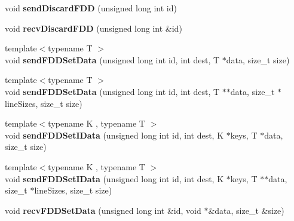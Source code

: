 \begin{DoxyCompactItemize}
\item 
\hypertarget{classfaster_1_1fastComm_a7e1ca7788c4310cb84640812fa50a012}{}\label{classfaster_1_1fastComm_a7e1ca7788c4310cb84640812fa50a012} 
void {\bfseries send\+Discard\+F\+DD} (unsigned long int id)
\item 
\hypertarget{classfaster_1_1fastComm_aaa0a11dcde70a8dcf39b0773c9c15d43}{}\label{classfaster_1_1fastComm_aaa0a11dcde70a8dcf39b0773c9c15d43} 
void {\bfseries recv\+Discard\+F\+DD} (unsigned long int \&id)
\item 
\hypertarget{classfaster_1_1fastComm_acc7534571a62d6df7c4f7a13d69b9e41}{}\label{classfaster_1_1fastComm_acc7534571a62d6df7c4f7a13d69b9e41} 
{\footnotesize template$<$typename T $>$ }\\void {\bfseries send\+F\+D\+D\+Set\+Data} (unsigned long int id, int dest, T $\ast$data, size\+\_\+t size)
\item 
\hypertarget{classfaster_1_1fastComm_a71e3ddff08c78a0a0e4cfb03f3ebf63c}{}\label{classfaster_1_1fastComm_a71e3ddff08c78a0a0e4cfb03f3ebf63c} 
{\footnotesize template$<$typename T $>$ }\\void {\bfseries send\+F\+D\+D\+Set\+Data} (unsigned long int id, int dest, T $\ast$$\ast$data, size\+\_\+t $\ast$line\+Sizes, size\+\_\+t size)
\item 
\hypertarget{classfaster_1_1fastComm_aeaf4e75975319f16c3c9544b8ab9309e}{}\label{classfaster_1_1fastComm_aeaf4e75975319f16c3c9544b8ab9309e} 
{\footnotesize template$<$typename K , typename T $>$ }\\void {\bfseries send\+F\+D\+D\+Set\+I\+Data} (unsigned long int id, int dest, K $\ast$keys, T $\ast$data, size\+\_\+t size)
\item 
\hypertarget{classfaster_1_1fastComm_aa1937f0dfe57c88c95c3c03596df3298}{}\label{classfaster_1_1fastComm_aa1937f0dfe57c88c95c3c03596df3298} 
{\footnotesize template$<$typename K , typename T $>$ }\\void {\bfseries send\+F\+D\+D\+Set\+I\+Data} (unsigned long int id, int dest, K $\ast$keys, T $\ast$$\ast$data, size\+\_\+t $\ast$line\+Sizes, size\+\_\+t size)
\item 
\hypertarget{classfaster_1_1fastComm_aa370d793025cbed0d74391a8e6dccf46}{}\label{classfaster_1_1fastComm_aa370d793025cbed0d74391a8e6dccf46} 
void {\bfseries recv\+F\+D\+D\+Set\+Data} (unsigned long int \&id, void $\ast$\&data, size\+\_\+t \&size)
\item 
\hypertarget{classfaster_1_1fastComm_abe5fb47fb54ef8bea608eec1ccbbcae6}{}\label{classfaster_1_1fastComm_abe5fb47fb54ef8bea608eec1ccbbcae6} 

\end{DoxyCompactItemize}
